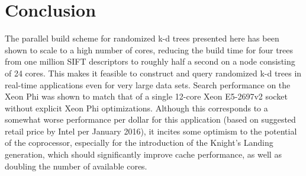 \section{Conclusion}
\label{sec:conclusion}


The parallel build scheme for randomized k-d trees presented here has been shown to scale to a high number of cores, reducing the build time for four trees from one million SIFT descriptors to roughly half a second on a node consisting of 24 cores. This makes it feasible to construct and query randomized k-d trees in real-time applications even for very large data sets. Search performance on the Xeon Phi was shown to match that of a single 12-core Xeon E5-2697v2 socket
without explicit Xeon Phi optimizations. Although this corresponds to a somewhat worse performance per dollar for this application (based on suggested retail price by Intel per January 2016), it incites some optimism to the potential of the coprocessor, especially for the introduction of the Knight's Landing generation, which should significantly improve cache performance, as well as doubling the number of available cores. 

